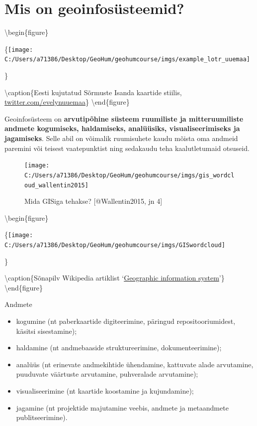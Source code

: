 \documentclass[
]{book}
\providecommand{\tightlist}{%
  \setlength{\itemsep}{0pt}\setlength{\parskip}{0pt}}
\begin{document}
\hypertarget{mis-on-geoinfosuxfcsteemid}{%
\section{Mis on geoinfosüsteemid?}\label{mis-on-geoinfosuxfcsteemid}}

\textbackslash begin\{figure\}

\{\centering \texttt{[image: C:/Users/a71386/Desktop/GeoHum/geohumcourse/imgs/example\_lotr\_uuemaa]}

\}

\textbackslash caption\{Eesti kujutatud Sõrmuste Isanda kaartide stiilis, \href{https://twitter.com/evelynuuemaa/status/1291261715095662592?s=07\&fbclid=IwAR1q6bpp4c7UNOTYph2YngZ7DrlBzrftR1gX2upWtoVNxLNzdFsgXZv_sVQ}{twitter.com/evelynuuemaa}\}\label{fig:lotr-map}
\textbackslash end\{figure\}

Geoinfosüsteem on \textbf{arvutipõhine süsteem ruumiliste ja mitteruumiliste andmete kogumiseks, haldamiseks, analüüsiks, visualiseerimiseks ja jagamiseks}. Selle abil on võimalik ruumisuhete kaudu mõista oma andmeid paremini või teisest vaatepunktist ning sedakaudu teha kaalutletumaid otsuseid.

\begin{figure}

{\centering \texttt{[image: C:/Users/a71386/Desktop/GeoHum/geohumcourse/imgs/gis\_wordcloud\_wallentin2015]} 

}

\caption{Mida GISiga tehakse? [@Wallentin2015, jn 4]}\label{fig:gis-wordcloud}
\end{figure}

\textbackslash begin\{figure\}

\{\centering \texttt{[image: C:/Users/a71386/Desktop/GeoHum/geohumcourse/imgs/GISwordcloud]}

\}

\textbackslash caption\{Sõnapilv Wikipedia artiklist `\href{https://en.wikipedia.org/wiki/Geographic_information_system}{Geographic information system}'\}\label{fig:gis-wordcloud2}
\textbackslash end\{figure\}

Andmete

\begin{itemize}
\tightlist
\item
  kogumine (nt paberkaartide digiteerimine, päringud repositooriumidest, käsitsi sisestamine);\\
\item
  haldamine (nt andmebaaside struktureerimine, dokumenteerimine);\\
\item
  analüüs (nt erinevate andmekihtide ühendamine, kattuvate alade arvutamine, puuduvate väärtuste arvutamine, puhveralade arvutamine);
\item
  visualiseerimine (nt kaartide koostamine ja kujundamine);
\item
  jagamine (nt projektide majutamine veebis, andmete ja metaandmete publitseerimine).
\end{itemize}
\end{document}
